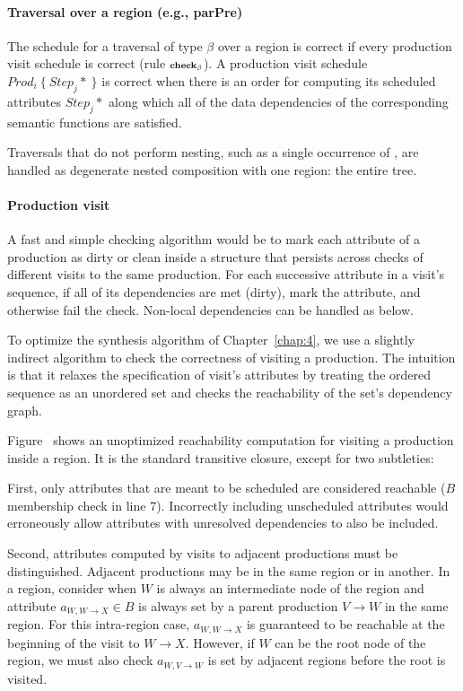 \paragraph*{Traversal over a region (e.g., parPre)}
The schedule for a traversal of type $\beta$ over a region is correct if every production visit schedule is correct (rule ${\scriptstyle\textbf {check}_\beta}$). A production visit schedule $Prod_i~\{~Step_j*~\}$ is correct when there is an order for computing its scheduled attributes $Step_j*$ along which all of the data dependencies of the corresponding semantic functions are satisfied. %

Traversals that do not perform nesting, such as a single occurrence of , are handled as degenerate nested composition with one region: the entire tree.

\paragraph*{Production visit}

A fast and simple checking algorithm would be to mark each attribute  of a production as dirty or clean inside a structure that persists across checks of different visits to the same production. For each successive attribute in a visit's sequence, if all of its dependencies are met (dirty), mark the attribute, and otherwise fail the check. Non-local dependencies can be handled as below.


To optimize the synthesis algorithm of Chapter~\ref{chap:4}, we use a slightly indirect algorithm to check the correctness of visiting a production.  The intuition is that it relaxes the specification of visit's attributes by treating the ordered sequence as an unordered set and checks the reachability of the set's dependency graph. 

Figure~ shows an unoptimized reachability computation for visiting a production inside a  region. It is the standard transitive closure, except for two subtleties:

First, only attributes that are meant to be scheduled are considered reachable ($B$ membership check in line 7). Incorrectly including unscheduled attributes would erroneously allow attributes with unresolved dependencies to also be included.  

Second, attributes computed by visits to adjacent productions must be distinguished. Adjacent productions may be in the same region or in another. In a  region, consider when $W$ is always an intermediate node of the region and attribute $a_{W,W{\rightarrow}X} \in B$ is always set by a parent production $V{\rightarrow}W$ in the same region. For this intra-region case, $a_{W,W{\rightarrow}X}$ is guaranteed to be reachable at the beginning of the visit to $W{\rightarrow}X$.  However, if $W$ can be the root node of the region, we must also check $a_{W,V{\rightarrow}W}$ is set by adjacent regions before the root is visited. %

